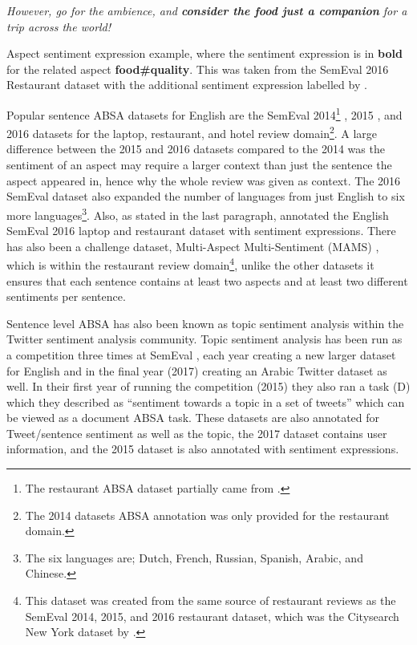 \begin{example}
\textit{However, go for the ambience, and \textbf{consider the food just a companion} for a trip across the world!}
\caption{Aspect sentiment expression example, where the sentiment expression is in \textbf{bold} for the related aspect \textbf{food\#quality}. This was taken from the SemEval 2016 Restaurant dataset \citep{pontiki-etal-2016-semeval} with the additional sentiment expression labelled by \citet{kaljahi-foster-2018-sentiment}.}
\label{example:lit_review_sentence_aspect_sentiment_expression}
\end{example}

Popular sentence ABSA datasets for English are the SemEval 2014\footnote{The restaurant ABSA dataset partially came from \citet{Ganu2009BeyondTS}.} \citep{pontiki-etal-2014-semeval}, 2015 \citep{pontiki-etal-2015-semeval}, and 2016 \citep{pontiki-etal-2016-semeval} datasets for the laptop, restaurant, and hotel review domain\footnote{The 2014 datasets ABSA annotation was only provided for the restaurant domain.}. A large difference between the 2015 and 2016 datasets compared to the 2014 was the sentiment of an aspect may require a larger context than just the sentence the aspect appeared in, hence why the whole review was given as context. The 2016 SemEval dataset also expanded the number of languages from just English to six more languages\footnote{The six languages are; Dutch, French, Russian, Spanish, Arabic, and Chinese.}. Also, as stated in the last paragraph, \citet{kaljahi-foster-2018-sentiment} annotated the English SemEval 2016 laptop and restaurant dataset with sentiment expressions. There has also been a challenge dataset, Multi-Aspect Multi-Sentiment (MAMS) \citep{jiang-etal-2019-challenge}, which is within the restaurant review domain\footnote{This dataset was created from the same source of restaurant reviews as the SemEval 2014, 2015, and 2016 restaurant dataset, which was the Citysearch New York dataset by \citet{Ganu2009BeyondTS}.}, unlike the other datasets it ensures that each sentence contains at least two aspects and at least two different sentiments per sentence.

Sentence level ABSA has also been known as topic sentiment analysis within the Twitter sentiment analysis community. Topic sentiment analysis has been run as a competition three times at SemEval \citep{rosenthal-etal-2015-semeval, nakov-etal-2016-semeval, rosenthal-etal-2017-semeval}, each year creating a new larger dataset for English and in the final year (2017) creating an Arabic Twitter dataset as well. In their first year of running the competition (2015) they also ran a task (D) which they described as ``sentiment towards a topic in a set of tweets'' which can be viewed as a document ABSA task. These datasets are also annotated for Tweet/sentence sentiment as well as the topic, the 2017 dataset contains user information, and the 2015 dataset is also annotated with sentiment expressions.

